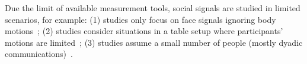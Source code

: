 Due the limit of available measurement tools, social signals are studied in limited scenarios, for example: (1) studies only focus on face signals ignoring body motions~\cite{messinger2009automated, lucas_trust_2016,mckeown2012semaine}; (2) studies consider situations in a table setup where participants' motions are limited~\cite{carletta2005ami, Lepri-12,messinger2009automated, nojavanasghari2016emoreact, lucas_trust_2016,mckeown2012semaine}; (3) studies assume a small number of people (mostly dyadic communications)~\cite{messinger2009automated,nojavanasghari2016emoreact, lucas_trust_2016, katsimerou2016crowdsourcing,mckeown2012semaine,gunes2006bimodal}.
% 
%
%
%
%
%
%
